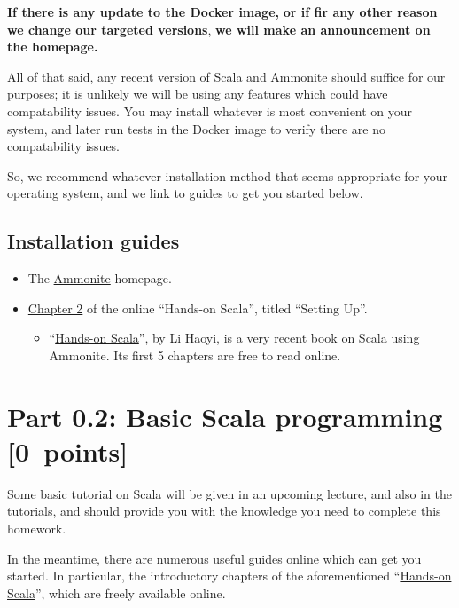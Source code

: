 \documentclass[11pt]{article}
\begin{document}
\begin{center}
\textbf{If there is any update to the Docker image,}
\textbf{or if fir any other reason we change our targeted versions},
\textbf{we will make an announcement on the homepage.}
\end{center}

All of that said, any recent version of Scala and Ammonite
should suffice for our purposes; it is unlikely we will
be using any features which could have compatability issues.
You may install whatever is most convenient on your system,
and later run tests in the Docker image
to verify there are no compatability issues.

So, we recommend whatever installation method
that seems appropriate for your operating system,
and we link to guides to get you started below.

\subsection*{Installation guides}
\label{sec:orgf05a29f}
\begin{itemize}
\item The \href{https://ammonite.io}{Ammonite} homepage.
\item \href{https://www.handsonscala.com/chapter-2-setting-up.html}{Chapter 2} of
the online “Hands-on Scala”, titled “Setting Up”.
\begin{itemize}
\item “\href{https://www.handsonscala.com/index.html}{Hands-on Scala}”, by Li Haoyi,
is a very recent book on Scala using Ammonite.
Its first 5 chapters are free to read online.
\end{itemize}
\end{itemize}

\section*{Part 0.2: Basic Scala programming           [0 points]}
\label{sec:org0a64573}
Some basic tutorial on Scala will be given
in an upcoming lecture, and also in the tutorials,
and should provide you with the knowledge you need
to complete this homework.

In the meantime, there are numerous useful guides online
which can get you started.
In particular, the introductory chapters
of the aforementioned “\href{https://www.handsonscala.com/table-of-contents.html}{Hands-on Scala}”,
which are freely available online.
\end{document}
